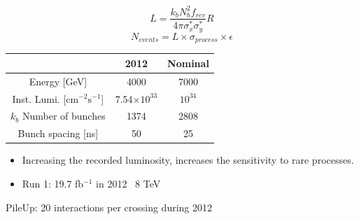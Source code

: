 \begin{frame}{}
\begin{columns}
\begin{column}{.50\textwidth}
\begin{block}{}
\begin{equation*}
  L=\frac{k_{b}N_{b}^{2}f_{rev}}{4\pi\sigma^{*}_{x}\sigma^{*}_{y}}R                                     
\end{equation*}
\begin{equation*}
  N_{events}=L\times \sigma_{process} \times \epsilon
\end{equation*}
\end{block}

\tiny{
\begin{center}
\begin{tabular}{|c|c c|}
\hline
 & 2012 & Nominal \\
\hline
Energy [GeV]& 4000 & 7000 \\
Inst. Lumi. [$\text{cm}^{-2}\text{s}^{-1}$] & 7.54$\times10^{33}$ & $10^{34}$ \\
$k_{b}$ Number of bunches & 1374 & 2808 \\
Bunch spacing [ns] & 50 & 25 \\
\hline
\end{tabular}
\end{center}
}%

\begin{block}{}
\begin{itemize}\scriptsize
\item Increasing the recorded luminosity, increases the sensitivity to rare processes.
\item Run 1: 19.7 fb$^{-1}$ in 2012 \MVAt~8 TeV
\end{itemize}
\end{block}
\begin{block}{}
\scriptsize PileUp: 20 interactions per crossing during 2012
\end{block}
\end{column}
\end{columns}

\end{frame}

